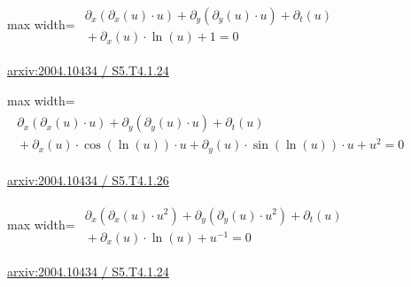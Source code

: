 \documentclass[10pt,a4paper]{article}
\begin{document}
\begin{minipage}{\linewidth}
\begin{center}\begin{adjustbox}{max width=\linewidth}$\displaystyle\begin{gathered}\begin{gathered}\partial_{x}(\partial_{x}(u)\cdot u)+\partial_{y}(\partial_{y}(u)\cdot u)+\partial_{t}(u)\\[-1pt]{}+\partial_{x}(u)\cdot \ln(u)+1=0\end{gathered}\end{gathered}$\end{adjustbox}\end{center}
{\small \href{https://arxiv.org/html/2004.10434#S5.T4.1.24}{arxiv:2004.10434 / S5.T4.1.24}}\par
\end{minipage}\par\vspace{7mm}

\begin{minipage}{\linewidth}
\begin{center}\begin{adjustbox}{max width=\linewidth}$\displaystyle\begin{gathered}\begin{gathered}\partial_{x}(\partial_{x}(u)\cdot u)+\partial_{y}(\partial_{y}(u)\cdot u)+\partial_{t}(u)\\[-1pt]{}+\partial_{x}(u)\cdot \cos(\ln(u))\cdot u+\partial_{y}(u)\cdot \sin(\ln(u))\cdot u+u^{2}=0\end{gathered}\end{gathered}$\end{adjustbox}\end{center}
{\small \href{https://arxiv.org/html/2004.10434#S5.T4.1.26}{arxiv:2004.10434 / S5.T4.1.26}}\par
\end{minipage}\par\vspace{7mm}

\begin{minipage}{\linewidth}
\begin{center}\begin{adjustbox}{max width=\linewidth}$\displaystyle\begin{gathered}\begin{gathered}\partial_{x}(\partial_{x}(u)\cdot u^{2})+\partial_{y}(\partial_{y}(u)\cdot u^{2})+\partial_{t}(u)\\[-1pt]{}+\partial_{x}(u)\cdot \ln(u)+u^{-1}=0\end{gathered}\end{gathered}$\end{adjustbox}\end{center}
{\small \href{https://arxiv.org/html/2004.10434#S5.T4.1.24}{arxiv:2004.10434 / S5.T4.1.24}}\par
\end{minipage}\par\vspace{7mm}
\end{document}
